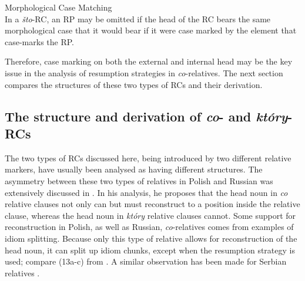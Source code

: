 \documentclass[output=paper]{langsci/langscibook}
\begin{document}
\ea%
    \label{ex:leska:12}
Morphological Case Matching\\
In a \textit{što}{}-RC, an RP may be omitted if the head of the RC bears the same morphological case that it would bear if it were case marked by the element that case-marks the RP.
    \z

Therefore, case marking on both the external and internal head may be the key issue in the analysis of resumption strategies in \textit{co}{}-relatives. The next section compares the structures of these two types of RCs and their derivation.

\subsection{The structure and derivation of \textit{co}{}- and \textit{który}{}-RCs}%
The two types of RCs discussed here, being introduced by two different relative markers, have usually been analysed as having different structures. The asymmetry between these two types of relatives in Polish and Russian was extensively discussed in \citet{Szczegielniak2005,Szczegielniak2006}. In his analysis, he proposes that the head noun in \textit{co} relative clauses not only can but must reconstruct to a position inside the relative clause, whereas the head noun in \textit{który} relative clauses cannot. Some support for reconstruction in Polish, as well as Russian, \textit{co}{}-relatives comes from examples of idiom splitting. Because only this type of relative allows for reconstruction of the head noun, it can split up idiom chunks, except when the resumption strategy is used; compare (13a-c) from \citet[377]{Szczegielniak2006}. A similar observation has been made for Serbian relatives \citep{Mitrović2012}.

\ea%
    \label{ex:leska:13}
    \z
\z    
    
\end{document}
